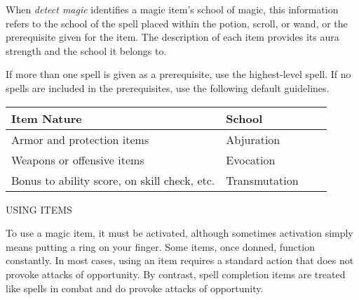 When \textit{detect magic }identifies a magic item's school of magic, this information 
refers to the school of the spell placed within the potion, scroll, or wand, or 
the prerequisite given for the item. The description of each item provides its 
aura strength and the school it belongs to.

If more than one spell is given as a prerequisite, use the highest-level spell. 
If no spells are included in the prerequisites, use the following default guidelines.

\begin{longtable}{llll}
\hline
\multicolumn{1}{|p{2.472in}|}{\begin{minipage}[t]{2.472in}\raggedright
\textbf{Item Nature}\end{minipage}} & \multicolumn{1}{p{0.960in}|}{\begin{minipage}[t]{0.960in}\raggedright
\textbf{School}\end{minipage}}\\
\hline
\multicolumn{1}{p{0.069in}|}{\begin{minipage}[t]{0.069in}\raggedright
Armor and protection items\end{minipage}} & \multicolumn{1}{p{0.069in}|}{\begin{minipage}[t]{0.069in}\raggedright
Abjuration\end{minipage}}\\
\hline
\multicolumn{1}{|p{2.472in}|}{\begin{minipage}[t]{2.472in}\raggedright
Weapons or offensive items\end{minipage}} & \multicolumn{1}{p{0.960in}|}{\begin{minipage}[t]{0.960in}\raggedright
Evocation\end{minipage}}\\
\hline
\multicolumn{1}{p{0.069in}|}{\begin{minipage}[t]{0.069in}\raggedright
Bonus to ability score, on skill check, etc.\end{minipage}} & \multicolumn{1}{p{0.069in}|}{\begin{minipage}[t]{0.069in}\raggedright
Transmutation\end{minipage}}\\
\hline
\end{longtable}

\vspace{12pt}
{\large USING ITEMS}

To use a magic item, it must be activated, although sometimes activation simply 
means putting a ring on your finger. Some items, once donned, function constantly. 
In most cases, using an item requires a standard action that does not provoke attacks 
of opportunity. By contrast, spell completion items are treated like spells in 
combat and do provoke attacks of opportunity.

